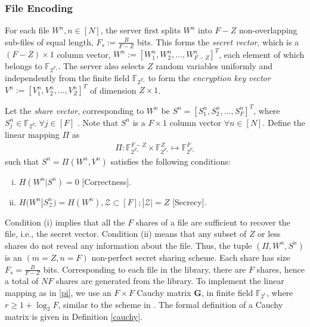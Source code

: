 \documentclass[conference]{IEEEtran}
\begin{document}
\subsubsection{File Encoding}  For each file $W^n,n\in[N]$, the server first splits $W^n$ into $F-Z$ non-overlapping sub-files of equal length, $F_s:=\frac{B}{F-Z}$ bits. This forms the \emph{secret vector}, which is a $(F-Z)\times 1$ column vector, ${W}^n:=[W^n_1,W^n_2,\ldots,W^n_{F-Z}]^T$, each element of which belongs to $\mathbb{F}_{2^{F_s}}$. The server also selects $Z$ random variables uniformly and independently from the finite field $\mathbb{F}_{2^{F_s}}$ to form the \emph{encryption key vector} ${V}^n:=[V^n_1,V^n_2,\ldots,V^n_Z]^T$ of dimension $Z\times 1$. 
\par Let the \emph{share vector}, corresponding to $W^n$ be ${S}^n=[S^n_1, S^n_2,\ldots, S^n_F]^T$, where $ S^n_j\in\mathbb{F}_{2^{F_s}} \ \forall j\in[F]$ . Note that $S^n$ is a $F\times 1$ column vector $\forall n\in [N]$. Define the linear mapping $\Pi$ as
	\begin{align}\label{pi}
	\Pi:\mathbb{F}_{2^{F_s}}^{F-Z}\times \mathbb{F}_{2^{F_s}}^{Z}\mapsto \mathbb{F}_{2^{F_s}}^{F}
	\end{align}
	such that ${S}^n=\Pi({W}^n,{V}^n)$  satisfies the following conditions:
	\begin{enumerate}[(i)]
		\item	$H({W}^n|{S}^n)= 0$ [Correctness].
		\item	$H({W}^n|{S}^n_{\mathcal{Z}})= H({W}^n), \mathcal{Z}\subset[F]; |\mathcal{Z}|=Z$ [Secrecy].
	\end{enumerate}
	Condition (i) implies that all the $F$ shares of a file are sufficient to recover the file, i.e., the secret vector. Condition (ii) means that any subset of $Z$ or less shares do not reveal any information about the file. Thus, the tuple $(\Pi,W^n,S^n)$ is an $(m=Z,n=F)$ non-perfect secret sharing scheme. Each share has size $F_s=\frac{B}{F-Z}$ bits. Corresponding to each file in the library, there are $F$ shares, hence a total of $NF$ shares are generated from the library. To implement the linear mapping as in \eqref{pi}, we use an $F\times F$ Cauchy matrix $\mathbf{G}$, in finite field $\mathbb{F}_{2^r}$, where $r\geq1+\log_2{F}$, similar to the scheme in \cite{SecretiveCollud}. The formal definition of a Cauchy matrix is given in Definition \ref{cauchy}.
\end{document}

